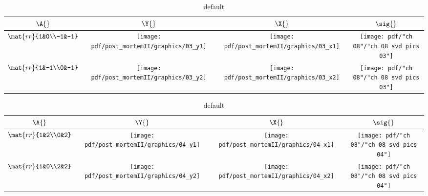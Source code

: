 \break
\clearpage
\begin{landscape}
\thispagestyle{empty}
\begin{table}[htdp]
\begin{center}
\begin{tabular}{cccc}
  $\A{}$ & $\Y{}$ & $\X{}$ & $\sig{}$\\ \hline\hline
  $\mat{rr}{1&0\\-1&-1}$ \qquad & \qquad 
  \texttt{[image: pdf/post\_mortemII/graphics/03\_y1]} \qquad & \qquad 
  \texttt{[image: pdf/post\_mortemII/graphics/03\_x1]} \qquad & \qquad 
  \texttt{[image: pdf/"ch 08"/"ch 08 svd pics 03"]} \\
  $\mat{rr}{1&-1\\0&-1}$ \qquad & \qquad 
  \texttt{[image: pdf/post\_mortemII/graphics/03\_y2]} \qquad & \qquad 
  \texttt{[image: pdf/post\_mortemII/graphics/03\_x2]} \qquad & \qquad 
  \texttt{[image: pdf/"ch 08"/"ch 08 svd pics 03"]} \\
\end{tabular}
\end{center}
\caption{default}
\label{tab:pmII:visualsc}
\end{table}%
\end{landscape}


\break
\clearpage
\begin{landscape}
\thispagestyle{empty}
\begin{table}[htdp]
\begin{center}
\begin{tabular}{cccc}
  $\A{}$ & $\Y{}$ & $\X{}$ & $\sig{}$\\ \hline\hline
  $\mat{rr}{1&2\\0&2}$ \qquad & \qquad 
  \texttt{[image: pdf/post\_mortemII/graphics/04\_y1]} \qquad & \qquad 
  \texttt{[image: pdf/post\_mortemII/graphics/04\_x1]} \qquad & \qquad 
  \texttt{[image: pdf/"ch 08"/"ch 08 svd pics 04"]} \\
  $\mat{rr}{1&0\\2&2}$ \qquad & \qquad 
  \texttt{[image: pdf/post\_mortemII/graphics/04\_y2]} \qquad & \qquad 
  \texttt{[image: pdf/post\_mortemII/graphics/04\_x2]} \qquad & \qquad 
  \texttt{[image: pdf/"ch 08"/"ch 08 svd pics 04"]} \\
\end{tabular}
\end{center}
\caption{default}
\label{tab:pmII:visualsd}
\end{table}%
\end{landscape}

\endinput